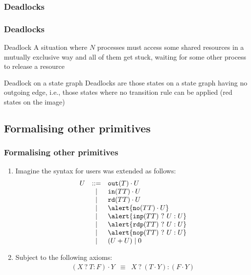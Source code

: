 \documentclass[presentation]{beamer}\mode<presentation>{\usetheme{AMSCesenaPurpleAndGold}}
\begin{document}
\subsubsection{Deadlocks}

\begin{frame}
\frametitle{Deadlocks}
    \begin{block}{Deadlock}
        A situation where $N$ processes must access some shared resources in a mutually exclusive way and all of them get stuck, waiting for some other process to release a resource
    \end{block}
    
    \pause\vfill
    
    \vfill
    
    \begin{alertblock}{Deadlock on a state graph}
        Deadlocks are those states on a state graph having \alert{no outgoing edge}, i.e., those states where \alert{no transition rule} can be applied (red states on the image)
    \end{alertblock}

\end{frame}

\subsection{Formalising other primitives}

\begin{frame}
\frametitle{Formalising other primitives}
    
    \begin{enumerate}
        \item<1-> Imagine the syntax for users was extended as follows:
        \[\begin{array}{rcl}
            U &::=& \mathtt{out}(T) \cdot U \\
            &\mid& \mathtt{in}(TT) \cdot U \\
            &\mid& \mathtt{rd}(TT) \cdot U \\
            &\mid& \alert{\mathtt{no}(TT) \cdot U} \\
            &\mid& \alert{\mathtt{inp}(TT)\ ?\ U : U} \\
            &\mid& \alert{\mathtt{rdp}(TT)\ ?\ U : U} \\
            &\mid& \alert{\mathtt{nop}(TT)\ ?\ U : U} \\
            &\mid& (U + U) \mid 0
        \end{array}\]
        
        \item<2> Subject to the following axioms:
        \[\begin{array}{rcl}
            (X\ ?\ T : F) \cdot Y &\equiv& X\ ?\ (T \cdot Y) : (F \cdot Y)
        \end{array}\]
        
    \end{enumerate}
    
\end{frame}
\end{document}
